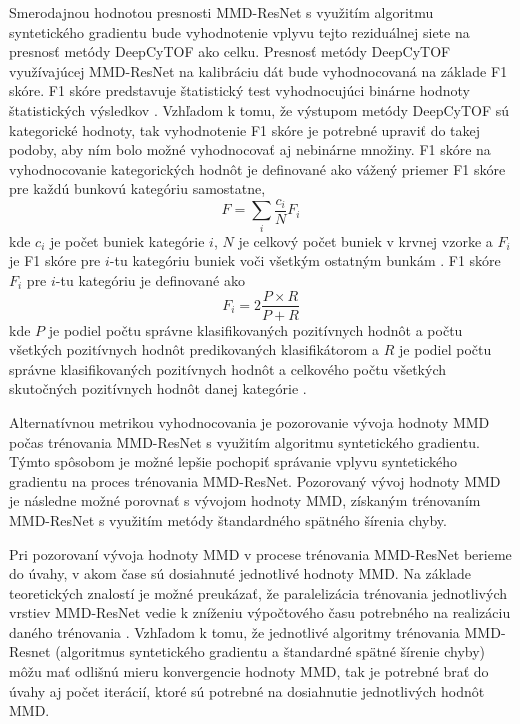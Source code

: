 Smerodajnou hodnotou presnosti MMD-ResNet s využitím algoritmu syntetického gradientu bude vyhodnotenie vplyvu tejto reziduálnej siete na presnosť metódy DeepCyTOF ako celku. Presnosť metódy DeepCyTOF využívajúcej MMD-ResNet na kalibráciu dát bude vyhodnocovaná na základe F1 skóre. F1 skóre predstavuje štatistický test vyhodnocujúci binárne hodnoty štatistických výsledkov \cite{sasaki2007truth}. Vzhľadom k tomu, že výstupom metódy DeepCyTOF sú kategorické hodnoty, tak vyhodnotenie F1 skóre je potrebné upraviť do takej podoby, aby ním bolo možné vyhodnocovať aj nebinárne množiny. F1 skóre na vyhodnocovanie kategorických hodnôt je definované ako vážený priemer F1 skóre pre každú bunkovú kategóriu samostatne, 
\begin{equation}
    F=\sum_i \frac{c_i}{N}F_i
\end{equation}
kde $c_i$ je počet buniek kategórie $i$, $N$ je celkový počet buniek v krvnej vzorke a $F_i$ je F1 skóre pre $i$-tu kategóriu buniek voči všetkým ostatným bunkám \cite{Li2017}. F1 skóre $F_i$ pre $i$-tu kategóriu je definované ako 
\begin{equation}
F_i=2\frac{P \times R}{P + R}
\end{equation}
kde $P$ je podiel počtu správne klasifikovaných pozitívnych hodnôt a počtu všetkých pozitívnych hodnôt predikovaných klasifikátorom a $R$ je podiel počtu správne klasifikovaných pozitívnych hodnôt a celkového počtu všetkých skutočných pozitívnych hodnôt danej kategórie \cite{sasaki2007truth}.

Alternatívnou metrikou vyhodnocovania je pozorovanie vývoja hodnoty MMD počas trénovania MMD-ResNet s využitím algoritmu syntetického gradientu. Týmto spôsobom je možné lepšie pochopiť správanie vplyvu syntetického gradientu na proces trénovania MMD-ResNet. Pozorovaný vývoj hodnoty MMD je následne možné porovnať s vývojom hodnoty MMD, získaným trénovaním MMD-ResNet s využitím metódy štandardného spätného šírenia chyby.

Pri pozorovaní vývoja hodnoty MMD v procese trénovania MMD-ResNet berieme do úvahy, v akom čase sú dosiahnuté jednotlivé hodnoty MMD. Na základe teoretických znalostí je možné preukázať, že paralelizácia trénovania jednotlivých vrstiev MMD-ResNet vedie k zníženiu výpočtového času potrebného na realizáciu daného trénovania \cite{Jaderberg2016, Czarnecki2017}. Vzhľadom k tomu, že jednotlivé algoritmy trénovania MMD-Resnet (algoritmus syntetického gradientu a štandardné spätné šírenie chyby) môžu mať odlišnú mieru konvergencie hodnoty MMD, tak je potrebné brať do úvahy aj počet iterácií, ktoré sú potrebné na dosiahnutie jednotlivých hodnôt MMD.

